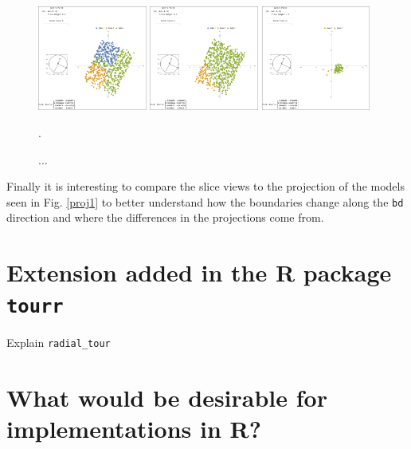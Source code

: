 \documentclass[]{interact}
\theoremstyle{plain}%
\theoremstyle{definition}
\theoremstyle{remark}
\begin{document}
\begin{figure}[ht]
\centerline{\includegraphics[width=0.32\textwidth]{figures/slice1_m_rf.png}
\includegraphics[width=0.32\textwidth]{figures/slice1_m_lda.png}
\includegraphics[width=0.32\textwidth]{figures/slice1_m_data.png}}
\caption{...}.
\label{slice1m}
\end{figure}

Finally it is interesting to compare the slice views to the projection
of the models seen in Fig. \ref{proj1} to better understand how the
boundaries change along the \texttt{bd} direction and where the
differences in the projections come from.

\hypertarget{extension-added-in-the-r-package-tourr}{%
\section{\texorpdfstring{Extension added in the R package
\texttt{tourr}}{Extension added in the R package tourr}}\label{extension-added-in-the-r-package-tourr}}

Explain \texttt{radial\_tour}

\hypertarget{what-would-be-desirable-for-implementations-in-r}{%
\section{What would be desirable for implementations in
R?}\label{what-would-be-desirable-for-implementations-in-r}}
\end{document}
